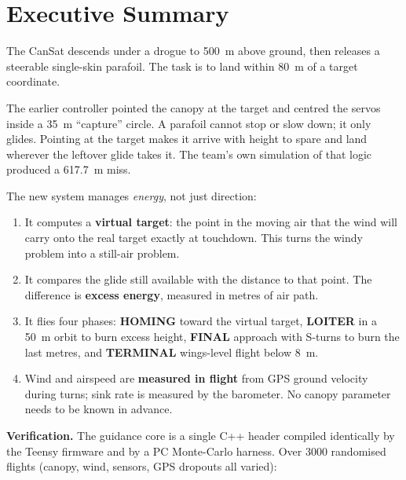 \documentclass[11pt,a4paper]{article}
\begin{document}
\tableofcontents
\newpage

\section{Executive Summary}

The CanSat descends under a drogue to \SI{500}{\meter} above ground, then
releases a steerable single-skin parafoil. The task is to land within
\SI{80}{\meter} of a target coordinate.

The earlier controller pointed the canopy at the target and centred the
servos inside a \SI{35}{\meter} ``capture'' circle. A parafoil cannot stop or
slow down; it only glides. Pointing at the target makes it arrive with height
to spare and land wherever the leftover glide takes it. The team's own
simulation of that logic produced a \SI{617.7}{\meter} miss.

The new system manages \emph{energy}, not just direction:

\begin{enumerate}
  \item It computes a \textbf{virtual target}: the point in the moving air
        that the wind will carry onto the real target exactly at touchdown.
        This turns the windy problem into a still-air problem.
  \item It compares the glide still available with the distance to that
        point. The difference is \textbf{excess energy}, measured in metres
        of air path.
  \item It flies four phases: \textbf{HOMING} toward the virtual target,
        \textbf{LOITER} in a \SI{50}{\meter} orbit to burn excess height,
        \textbf{FINAL} approach with S-turns to burn the last metres, and
        \textbf{TERMINAL} wings-level flight below \SI{8}{\meter}.
  \item Wind and airspeed are \textbf{measured in flight} from GPS ground
        velocity during turns; sink rate is measured by the barometer.
        No canopy parameter needs to be known in advance.
\end{enumerate}

\noindent\textbf{Verification.} The guidance core is a single C++ header
compiled identically by the Teensy firmware and by a PC Monte-Carlo
harness. Over 3000 randomised flights (canopy, wind, sensors, GPS dropouts
all varied):
\end{document}
